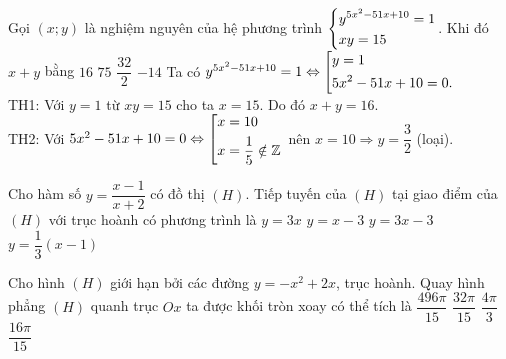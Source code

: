 \begin{ex}%
Gọi $(x;y)$ là nghiệm nguyên của hệ phương trình $\left\{\begin{aligned}&y^{5x^2-51x+10}=1\\&xy=15\end{aligned}\right.$. Khi đó $x+y$ bằng
\choice
{\True $16$}
{$75$}
{$\dfrac{32}{2}$}
{$-14$}
\loigiai
{Ta có $y^{5x^2-51x+10}=1\Leftrightarrow\left[\begin{aligned}&y=1\\&5x^2-51x+10=0.\end{aligned}\right.$\\TH1: Với $y=1$ từ $xy=15$ cho ta $x=15$. Do đó $x+y=16$.\\TH2: Với $5x^2-51x+10=0\Leftrightarrow\left[\begin{aligned}&x=10\\&x=\dfrac{1}{5}\notin\mathbb{Z}\end{aligned}\right.$ nên $x=10\Rightarrow y=\dfrac{3}{2}$ (loại).}
\end{ex}

\begin{ex}%
Cho hàm số $y=\dfrac{x-1}{x+2}$ có đồ thị $(H)$. Tiếp tuyến của $(H)$ tại giao điểm của $(H)$ với trục hoành có phương trình là
\choice
{$y=3x$}
{$y=x-3$}
{$y=3x-3$}
{\True $y=\dfrac{1}{3}(x-1)$}
\end{ex}

\begin{ex}%
Cho hình $(H)$ giới hạn bởi các đường $y=-x^2+2x$, trục hoành. Quay hình phẳng $(H)$ quanh trục $Ox$ ta được khối tròn xoay có thể tích là
\choice
{$\dfrac{496\pi}{15}$}
{$\dfrac{32\pi}{15}$}
{$\dfrac{4\pi}{3}$}
{\True $\dfrac{16\pi}{15}$}
\end{ex}

